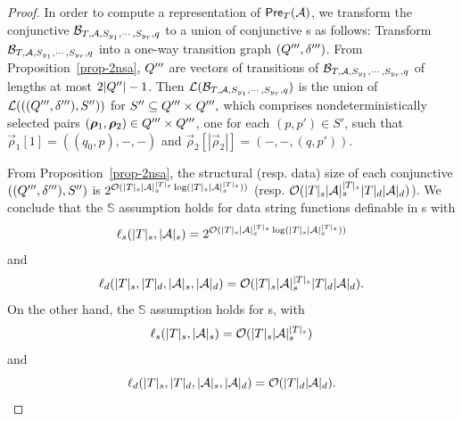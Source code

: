 \begin{proof}
In order to compute a representation of $\textsf{Pre}_{T}(\mathcal{A})$, we transform the conjunctive \SSA{} $\mathcal{B}_{T, \mathcal{A}, S_{y_1}, \cdots, S_{y_r},q}$ to a union of conjunctive \SA{}s as follows: Transform $\mathcal{B}_{T, \mathcal{A}, S_{y_1}, \cdots, S_{y_r}, q}$ into a one-way transition graph $(Q''',\delta''')$. From Proposition~\ref{prop-2nsa}, $Q'''$ are vectors of transitions of $\mathcal{B}_{T, \mathcal{A}, S_{y_1}, \cdots, S_{y_r}, q}$ of lengths at most $2|Q''|-1$. Then $\mathcal{L}(\mathcal{B}_{T, \mathcal{A}, S_{y_1}, \cdots, S_{y_r},q})$ is the union of $\mathcal{L}(((Q''',\delta'''), S''))$ for $S'' \subseteq Q''' \times Q''',$ which comprises nondeterministically selected pairs $(\vec{\rho}_1, \vec{\rho}_2) \in \controls''' \times \controls'''$, one for each $(p, p') \in S'$, such that $\vec{\rho}_1[1] = ((q_0, p), -, -)$ and  $\vec{\rho}_2[|\vec{\rho}_2|] = (-, -, (q, p'))$.

From Proposition~\ref{prop-2nsa}, the structural (resp. data) size of each conjunctive \SA{} $((Q''',\delta'''), S'')$
is  $ 2^{\mathcal{O}( |T|_s |\mathcal{A}|_s^{|T|_s} \log (|T|_s |\mathcal{A}|_s^{|T|_s}))}$ 
(resp. $ \mathcal{O}( |T|_s |\mathcal{A}|_s^{|T|_s} |T|_d |\mathcal{A}|_d )$). 
We conclude that 
the $\mathbb{S}$\prerec{} assumption holds for data string functions definable in \SSPT{}s with 
%
$$\ell_s(|T|_s, |\mathcal{A}|_s) = 2^{\mathcal{O}( |T|_s |\mathcal{A}|_s^{|T|_s} \log (|T|_s |\mathcal{A}|_s^{|T|_s}))}$$
 and 
$$\ell_d(|T|_s, |T|_d, |\mathcal{A}|_s, |\mathcal{A}|_d) = \mathcal{O}(|T|_s |\mathcal{A}|_s^{|T|_s} |T|_d |\mathcal{A}|_d).
$$
On the other hand, the $\mathbb{S}$\prerec{} assumption holds for \SPT{}s, with 
$$\ell_s(|T|_s, |\mathcal{A}|_s) = \mathcal{O}(|T|_s |\mathcal{A}|_s^{|T|_s})$$ 
and  
$$\ell_d(|T|_s, |T|_d, |\mathcal{A}|_s, |\mathcal{A}|_d) = \mathcal{O}(|T|_d |\mathcal{A}|_d).$$
\end{proof}




